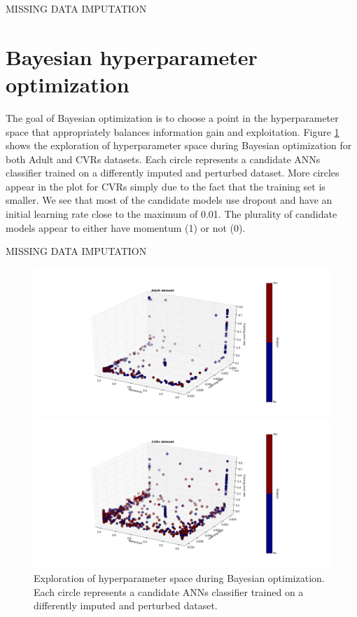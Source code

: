 \documentclass[10pt]{book}
\theoremstyle{definition}
\begin{document}
\clearpage
{}
{\hfill {\footnotesize\rm MISSING DATA IMPUTATION} \hfill}

\section{Bayesian hyperparameter optimization}
\setcounter{equation}{0}

The goal of Bayesian optimization is to choose a point in the hyperparameter space that appropriately balances information gain and exploitation. Figure \ref{fig:params} shows the exploration of hyperparameter space during Bayesian optimization for both Adult and CVRs datasets. Each circle represents a candidate ANNs classifier trained on a differently imputed and perturbed dataset. More circles appear in the plot for CVRs simply due to the fact that the training set is smaller. We see that most of the candidate models use dropout and have an initial learning rate close to the maximum of 0.01. The plurality of candidate models appear to either have momentum (1) or not (0).

\clearpage
{}
{\hfill {\footnotesize\rm MISSING DATA IMPUTATION} \hfill}

\begin{figure}[h!]
\includegraphics [scale=0.45, center]{../images/params3d_adult.png}\par
\includegraphics [scale=0.45, center]{../images/params3d_votes.png}\par
\caption{\footnotesize Exploration of hyperparameter space during Bayesian optimization. Each circle represents a candidate ANNs classifier trained on a differently imputed and perturbed dataset.}
   \label{fig:params}
\end{figure}
\end{document}

